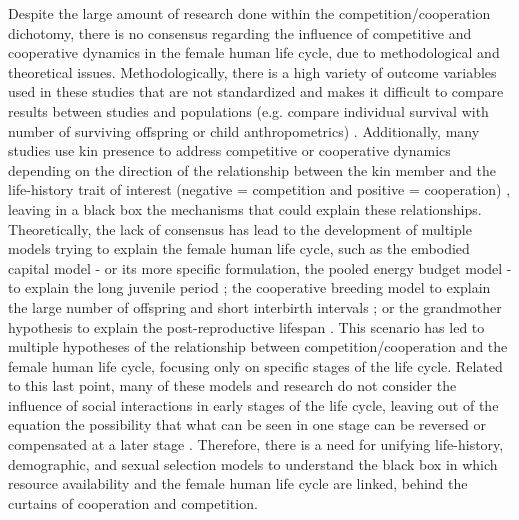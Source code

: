 \documentclass{article}
\begin{document}
Despite the large amount of research done within the competition/cooperation dichotomy, there is no consensus regarding the influence of competitive and cooperative dynamics in the female human life cycle, due to methodological and theoretical issues. Methodologically, there is a high variety of outcome variables used in these studies that are not standardized and makes it difficult to compare results between studies and populations (e.g. compare   individual survival with number of surviving offspring or child anthropometrics) \citep{brown2002reconsidering}. Additionally, many studies use kin presence to address competitive or cooperative dynamics depending on the direction of the relationship between the kin member and the life-history trait of interest (negative = competition and positive = cooperation) \citep{sear2011much}, leaving in a black box the mechanisms that could explain these relationships. Theoretically, the lack of consensus has lead to the development of multiple models trying to explain the female human life cycle, such as the embodied capital model - or its more specific formulation, the pooled energy budget model - to explain the long juvenile period \citep{kaplan2000theory,kramer2010pooled}; the cooperative breeding model to explain the large number of offspring and short interbirth intervals \citep{kramer2005children}; or the grandmother hypothesis to explain the post-reproductive lifespan \citep{hawkes2013grandmothers}. This scenario has led to multiple hypotheses of the relationship between competition/cooperation and the female human life cycle, focusing only on specific stages of the life cycle. Related to this last point, many of these models and research do not consider the influence of social interactions in early stages of the life cycle, leaving out of the equation the possibility that what can be seen in one stage can be reversed or compensated at a later stage \citep{mulder1998demographic}. Therefore, there is a need for unifying life-history, demographic, and sexual selection models to understand the black box in which resource availability and the female human life cycle are linked, behind the curtains of cooperation and competition.
\\\\
\end{document}
